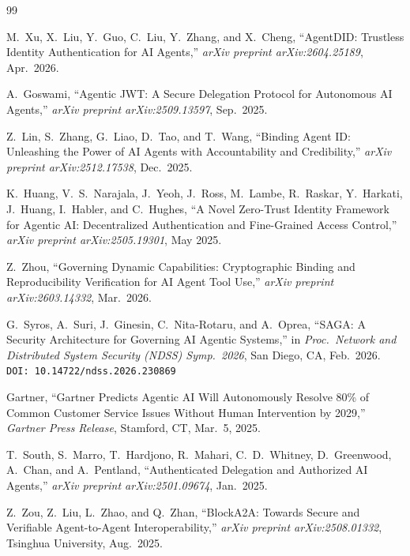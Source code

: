 \documentclass[review,5p,twocolumn,times]{elsarticle}
\begin{document}
\begin{thebibliography}{99}


M.~Xu, X.~Liu, Y.~Guo, C.~Liu, Y.~Zhang, and X.~Cheng,
``AgentDID: Trustless Identity Authentication for AI Agents,''
\textit{arXiv preprint arXiv:2604.25189}, Apr.\ 2026.

A.~Goswami,
``Agentic JWT: A Secure Delegation Protocol for Autonomous AI Agents,''
\textit{arXiv preprint arXiv:2509.13597}, Sep.\ 2025.

Z.~Lin, S.~Zhang, G.~Liao, D.~Tao, and T.~Wang,
``Binding Agent ID: Unleashing the Power of AI Agents with Accountability
and Credibility,''
\textit{arXiv preprint arXiv:2512.17538}, Dec.\ 2025.

K.~Huang, V.~S.~Narajala, J.~Yeoh, J.~Ross, M.~Lambe, R.~Raskar,
Y.~Harkati, J.~Huang, I.~Habler, and C.~Hughes,
``A Novel Zero-Trust Identity Framework for Agentic AI: Decentralized
Authentication and Fine-Grained Access Control,''
\textit{arXiv preprint arXiv:2505.19301}, May 2025.

Z.~Zhou,
``Governing Dynamic Capabilities: Cryptographic Binding and
Reproducibility Verification for AI Agent Tool Use,''
\textit{arXiv preprint arXiv:2603.14332}, Mar.\ 2026.

G.~Syros, A.~Suri, J.~Ginesin, C.~Nita-Rotaru, and A.~Oprea,
``SAGA: A Security Architecture for Governing AI Agentic Systems,''
in \textit{Proc.\ Network and Distributed System Security (NDSS) Symp.\ 2026},
San Diego, CA, Feb.\ 2026.
\texttt{DOI: 10.14722/ndss.2026.230869}

Gartner,
``Gartner Predicts Agentic AI Will Autonomously Resolve 80\% of
Common Customer Service Issues Without Human Intervention by 2029,''
\textit{Gartner Press Release}, Stamford, CT, Mar.\ 5, 2025.

T.~South, S.~Marro, T.~Hardjono, R.~Mahari, C.~D.~Whitney,
D.~Greenwood, A.~Chan, and A.~Pentland,
``Authenticated Delegation and Authorized AI Agents,''
\textit{arXiv preprint arXiv:2501.09674}, Jan.\ 2025.

Z.~Zou, Z.~Liu, L.~Zhao, and Q.~Zhan,
``BlockA2A: Towards Secure and Verifiable Agent-to-Agent Interoperability,''
\textit{arXiv preprint arXiv:2508.01332}, Tsinghua University, Aug.\ 2025.


\end{thebibliography}
\end{document}
